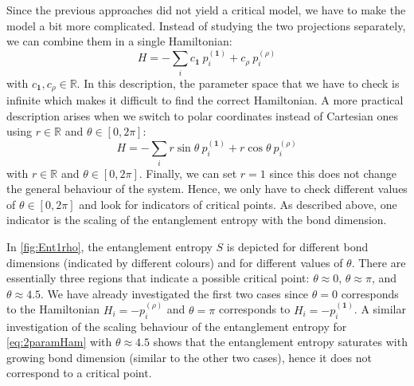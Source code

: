 Since the previous approaches did not yield a critical model, we have to make the model a bit more complicated. Instead of studying the two projections separately, we can combine them in a single Hamiltonian:
\begin{equation}
H=-\sum_i c_\mathbf{1}\ p_i^{(\mathbf{1})}+c_\rho \ p_i^{(\rho)}
\end{equation}
with $c_\mathbf{1},c_\rho\in\mathbb{R}$. In this description, the parameter space that we have to check is infinite which makes it difficult to find the correct Hamiltonian. A more practical description arises when we switch to polar coordinates instead of Cartesian ones using $r\in\mathbb{R}$ and $\theta\in[0,2 \pi]$:	
	\begin{equation}
	\label{eq:2paramHam}
		H=-\sum_i r\sin\theta\ p_i^{(\mathbf{1})}+r\cos\theta \ p_i^{(\rho)}
	\end{equation}
with $r\in\mathbb{R}$ and $\theta\in[0,2\pi]$. Finally, we can set $r=1$ since this does not change the general behaviour of the system. Hence, we only have to check different values of $\theta\in[0,2\pi]$ and look for indicators of critical points. As described above, one indicator is the scaling of the entanglement entropy with the bond dimension. 

In \cref{fig:Ent1rho}, the entanglement entropy $S$ is depicted for different bond dimensions (indicated by different colours) and for different values of $\theta$. There are essentially three regions that indicate a possible critical point: $\theta\approx 0$, $\theta\approx\pi$, and $\theta\approx 4.5$. We have already investigated the first two cases since $\theta=0$ corresponds to the Hamiltonian $H_i=-p_i^{(\rho)}$ and $\theta=\pi$ corresponds to $H_i=-p_i^{(\mathbf{1})}$. A similar investigation of the scaling behaviour of the entanglement entropy for \cref{eq:2paramHam} with $\theta\approx 4.5$ shows that the entanglement entropy saturates with growing bond dimension (similar to the other two cases), hence it does not correspond to a critical point.

